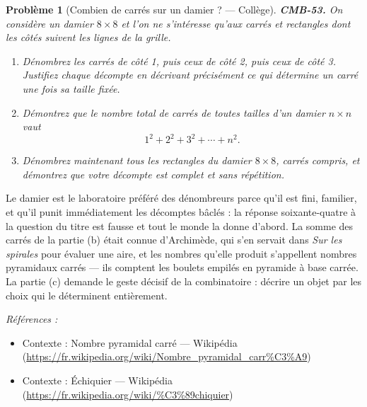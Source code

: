 \documentclass[11pt]{article}
\newtheorem{problem}{Problème}
\newenvironment{refs}{\par\small\noindent\emph{Références :}\begin{itemize}\setlength\itemsep{0pt}}{\end{itemize}\normalsize}
\begin{document}
\begin{problem}[{Combien de carrés sur un damier ? --- Collège}]
\textbf{CMB-53.} On considère un damier $ 8 \times 8 $ et l'on ne s'intéresse qu'aux carrés
et rectangles dont les côtés suivent les lignes de la grille.
\begin{enumerate}
\item[(a)] Dénombrez les carrés de côté 1, puis ceux de côté 2, puis ceux de côté 3. Justifiez chaque
décompte en décrivant précisément ce qui détermine un carré une fois sa taille fixée.
\item[(b)] Démontrez que le nombre total de carrés de toutes tailles d'un damier $ n \times n $ vaut
\[ 1^2 + 2^2 + 3^2 + \cdots + n^2 . \]
\item[(c)] Dénombrez maintenant tous les rectangles du damier $ 8 \times 8 $, carrés compris, et
démontrez que votre décompte est complet et sans répétition.
\end{enumerate}

\end{problem}

\noindent Le damier est le laboratoire préféré des dénombreurs parce qu'il est fini,
familier, et qu'il punit immédiatement les décomptes bâclés : la réponse \og{} soixante-quatre \fg{} à la
question du titre est fausse et tout le monde la donne d'abord. La somme des carrés de la partie
(b) était connue d'Archimède, qui s'en servait dans \textit{Sur les spirales} pour évaluer une aire, et les
nombres qu'elle produit s'appellent nombres pyramidaux carrés --- ils comptent les boulets empilés en
pyramide à base carrée. La partie (c) demande le geste décisif de la combinatoire : décrire un
objet par les choix qui le déterminent entièrement.

\begin{refs}
\item Contexte : Nombre pyramidal carré --- Wikipédia (\url{https://fr.wikipedia.org/wiki/Nombre_pyramidal_carr%C3%A9})
\item Contexte : Échiquier --- Wikipédia (\url{https://fr.wikipedia.org/wiki/%C3%89chiquier})
\end{refs}

\bigskip
\end{document}
